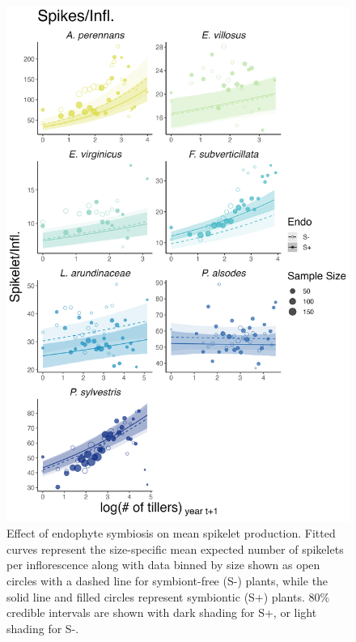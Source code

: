 \documentclass[9pt,twoside,lineno]{pnas-new}
\begin{document}
\begin{figure}
	\centering
	\includegraphics[width=.6\linewidth]{spike_meanplot.png}
	\caption{Effect of endophyte symbiosis on mean spikelet production. Fitted curves represent the size-specific mean expected number of spikelets per inflorescence along with data binned by size shown as open circles with a dashed line for symbiont-free (S-) plants, while the solid line and filled circles represent symbiontic (S+) plants. 80\% credible intervals are shown with dark shading for  S+, or light shading for S-.}
\end{figure}
\end{document}
